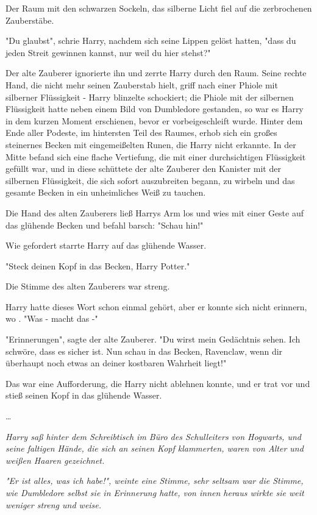 {Der Raum mit den schwarzen Sockeln, das silberne Licht fiel auf die zerbrochenen Zauberstäbe.

"Du glaubst", schrie Harry, nachdem sich seine Lippen gelöst hatten, "dass du jeden Streit gewinnen kannst, nur weil du hier stehst?"

Der alte Zauberer ignorierte ihn und zerrte Harry durch den Raum. Seine rechte Hand, die nicht mehr seinen Zauberstab hielt, griff nach einer Phiole mit silberner Flüssigkeit - Harry blinzelte schockiert; die Phiole mit der silbernen Flüssigkeit hatte neben einem Bild von Dumbledore gestanden, so war es Harry in dem kurzen Moment erschienen, bevor er vorbeigeschleift wurde. Hinter dem Ende aller Podeste, im hintersten Teil des Raumes, erhob sich ein großes steinernes Becken mit eingemeißelten Runen, die Harry nicht erkannte. In der Mitte befand sich eine flache Vertiefung, die mit einer durchsichtigen Flüssigkeit gefüllt war, und in diese schüttete der alte Zauberer den Kanister mit der silbernen Flüssigkeit, die sich sofort auszubreiten begann, zu wirbeln und das gesamte Becken in ein unheimliches Weiß zu tauchen.

Die Hand des alten Zauberers ließ Harrys Arm los und wies mit einer Geste auf das glühende Becken und befahl barsch: "Schau hin!"

Wie gefordert starrte Harry auf das glühende Wasser.

"Steck deinen Kopf in das Becken, Harry Potter."

Die Stimme des alten Zauberers war streng.

Harry hatte dieses Wort schon einmal gehört, aber er konnte sich nicht erinnern, wo . "Was - macht das -"

"Erinnerungen", sagte der alte Zauberer. "Du wirst mein Gedächtnis sehen. Ich schwöre, dass es sicher ist. Nun schau in das Becken, Ravenclaw, wenn dir überhaupt noch etwas an deiner kostbaren Wahrheit liegt!"

Das war eine Aufforderung, die Harry nicht ablehnen konnte, und er trat vor und stieß seinen Kopf in das glühende Wasser.

…

\emph{Harry saß hinter dem Schreibtisch im Büro des Schulleiters von Hogwarts, und seine faltigen Hände, die sich an seinen Kopf klammerten, waren von Alter und weißen Haaren gezeichnet.}

\emph{"Er ist alles, was ich habe!", weinte eine Stimme, sehr seltsam war die Stimme, wie Dumbledore selbst sie in Erinnerung hatte, von innen heraus wirkte sie weit weniger streng und weise.}

}
